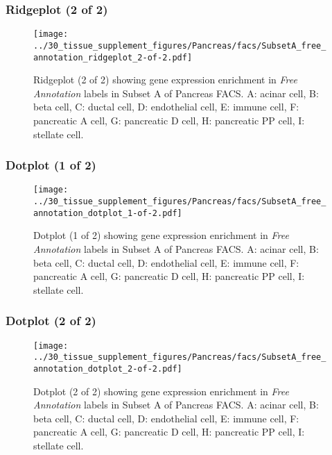 \clearpage

\subsubsection{Ridgeplot (2 of 2)}
\begin{figure}[h]
\centering
\texttt{[image: ../30\_tissue\_supplement\_figures/Pancreas/facs/SubsetA\_free\_annotation\_ridgeplot\_2-of-2.pdf]}

\caption{ Ridgeplot (2 of 2)  showing gene expression enrichment in \emph{Free Annotation} labels in Subset A of Pancreas FACS. A: acinar cell, B: beta cell, C: ductal cell, D: endothelial cell, E: immune cell, F: pancreatic A cell, G: pancreatic D cell, H: pancreatic PP cell, I: stellate cell.}
\end{figure}


\clearpage

\subsubsection{Dotplot (1 of 2)}
\begin{figure}[h]
\centering
\texttt{[image: ../30\_tissue\_supplement\_figures/Pancreas/facs/SubsetA\_free\_annotation\_dotplot\_1-of-2.pdf]}

\caption{ Dotplot (1 of 2)  showing gene expression enrichment in \emph{Free Annotation} labels in Subset A of Pancreas FACS. A: acinar cell, B: beta cell, C: ductal cell, D: endothelial cell, E: immune cell, F: pancreatic A cell, G: pancreatic D cell, H: pancreatic PP cell, I: stellate cell.}
\end{figure}


\clearpage

\subsubsection{Dotplot (2 of 2)}
\begin{figure}[h]
\centering
\texttt{[image: ../30\_tissue\_supplement\_figures/Pancreas/facs/SubsetA\_free\_annotation\_dotplot\_2-of-2.pdf]}

\caption{ Dotplot (2 of 2)  showing gene expression enrichment in \emph{Free Annotation} labels in Subset A of Pancreas FACS. A: acinar cell, B: beta cell, C: ductal cell, D: endothelial cell, E: immune cell, F: pancreatic A cell, G: pancreatic D cell, H: pancreatic PP cell, I: stellate cell.}
\end{figure}



